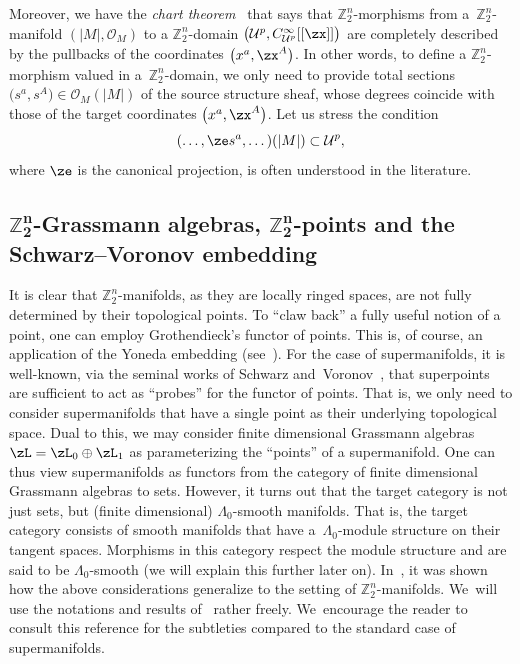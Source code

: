 \documentclass[pdftex]{sigma}%
\newcommand{\Z}{{\mathbb Z}}
\def\cO{\mathcal{O}}
\newcommand{\0}{\otimes}
\numberwithin{equation}{section}
\begin{document}
Moreover, we have the \emph{chart theorem}~\cite[Theorem 7.10]{Covolo:2016} that says that $\Z_2^n$-morphisms from a~$\Z_2^n$-manifold $(|M|,\cO_M)$ to a $\Z_2^n$-domain $\big(\mathcal{U}^p,C^\infty_{\mathcal{U}^p}[[\zx]]\big)$ are completely described by the pullbacks of the coordinates $\big(x^a,\zx^A\big)$. In other words, to define a $\Z_2^n$-morphism valued in a~$\Z_2^n$-domain, we only need to provide total sections $\big(s^a,s^A\big)\in\cO_M(|M|)$ of the source structure sheaf, whose degrees coincide with those of the target coordinates $\big(x^a,\zx^A\big)$. Let us stress the condition
\[
(\dots,\ze s^a,\dots)(|M|)\subset \mathcal{U}^p,
\]
where $\ze$ is the canonical projection, is often understood in the literature.

\subsection[Z2n-Grassmann algebras, Z2n-points and the Schwarz--Voronov embedding]
{$\boldsymbol{\Z_2^n}$-Grassmann algebras, $\boldsymbol{\Z_2^n}$-points and the Schwarz--Voronov embedding}

It is clear that $\Z_2^n$-manifolds, as they are locally ringed spaces, are not fully determined by their topological points. To ``claw back'' a fully useful notion of a point, one can employ Grothendieck's functor of points. This is, of course, an application of the Yoneda embedding (see~\cite[Chapter~III, Section~2]{MacLane1998}). For the case of supermanifolds, it is well-known, via the seminal works of Schwarz and~Voronov~\cite{Schwarz:1982,Schwarz:1984,Voronov:1984}, that superpoints are sufficient to act as ``probes'' for the functor of points. That is, we only need to consider supermanifolds that have a single point as their underlying topological space. Dual to this, we may consider finite dimensional Grassmann algebras $\zL=\zL_0\oplus \zL_1$ as parameterizing the ``points'' of a supermanifold. One can thus view supermanifolds as functors from the category of finite dimensional Grassmann algebras to sets. However, it turns out that the target category is not just sets, but (finite dimensional) $\Lambda_0$-smooth manifolds. That is, the target category consists of smooth manifolds that have a~$\Lambda_0$-module structure on their tangent spaces. Morphisms in this category respect the module structure and are said to be $\Lambda_0$-smooth (we will explain this further later on). In~\cite{Bruce:2019b}, it was shown how the above considerations generalize to the setting of $\Z_2^n$-manifolds. We~will use the notations and results of~\cite{Bruce:2019b} rather freely. We~encourage the reader to consult this reference for the subtleties compared to the standard case of supermanifolds.
\end{document}
